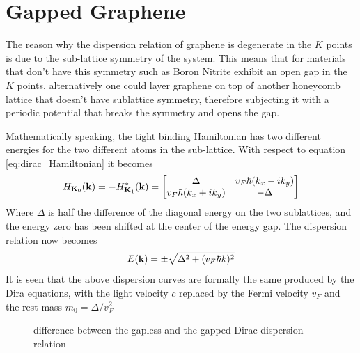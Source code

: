\section{Gapped Graphene}
The reason why the dispersion relation of graphene is degenerate in the $K$ points is due to the sub-lattice symmetry of the system. This means that for materials that don't have this symmetry such as Boron Nitrite exhibit an open gap in the $K$ points, alternatively one could layer graphene on top of another honeycomb lattice that doesn't have sublattice symmetry, therefore subjecting it with a periodic potential that breaks the symmetry and opens the gap.

Mathematically speaking, the tight binding Hamiltonian has two different energies for the two different atoms in the sub-lattice. With respect to equation \ref{eq:dirac_Hamiltonian} it becomes
\begin{equation}
    H_{\mathbf{K}_0}(\mathbf{k})=
    -H^*_{\mathbf{K}_1}(\mathbf{k})=
    \begin{bmatrix}
        \Delta& v_F\hbar(k_x-ik_y)\\
        v_F\hbar(k_x+ik_y)&-\Delta
    \end{bmatrix}
    \label{eq:gapped-dirac}
\end{equation}
Where $\Delta$ is half the difference of the diagonal energy on the two sublattices, and the energy zero has been shifted at the center of the energy gap. The dispersion relation now becomes
\begin{equation}
    E(\mathbf{k})=\pm\sqrt{\Delta^2 + (v_F\hbar k)^2}
\end{equation}
It is seen that the above dispersion curves are formally the same produced by the Dira equations, with the light velocity $c$ replaced by the Fermi velocity $v_F$ and the rest mass $m_0=\Delta/v_F^2$

\begin{figure}[h]
    \caption{difference between the gapless and the gapped Dirac dispersion relation}
    \label{fig:asd}
\end{figure}
